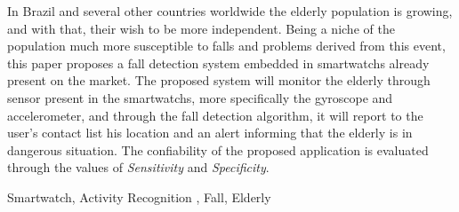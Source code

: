 In Brazil and several other countries worldwide the elderly population is growing, and with that, their wish to be more independent. Being a niche of the population much more susceptible to falls and problems derived from this event, this paper proposes a fall detection system embedded in smartwatchs already present on the market. The proposed system will monitor the elderly through sensor present in the smartwatchs, more specifically the gyroscope and accelerometer, and through the fall detection algorithm, it will report to the user's contact list his location and an alert informing that the elderly is in dangerous situation. The confiability of the proposed application is evaluated through the values of \textit{Sensitivity} and \textit{Specificity}.

\begin{keywords}
	Smartwatch, Activity Recognition , Fall, Elderly
\end{keywords}